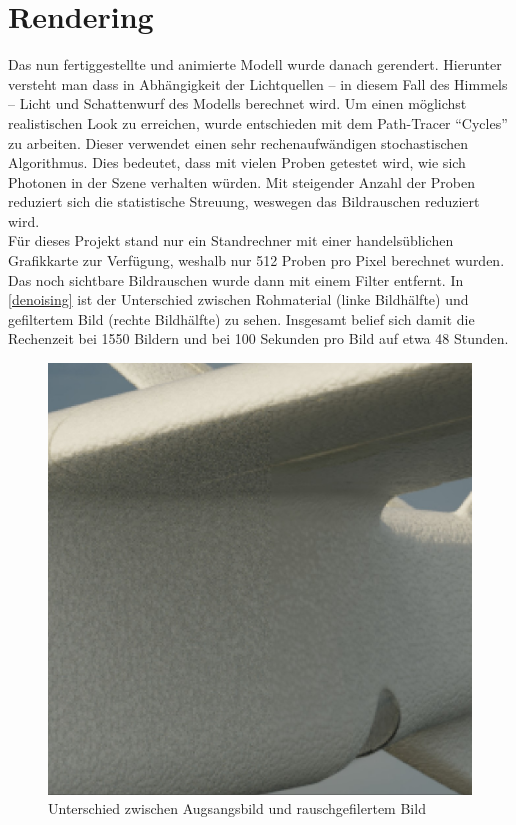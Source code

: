 \section{Rendering}
\label{sec:rendering}

Das nun fertiggestellte und animierte Modell wurde danach gerendert. Hierunter versteht man dass in Abhängigkeit der Lichtquellen -- in diesem Fall des Himmels -- Licht und Schattenwurf des Modells berechnet wird. Um einen möglichst realistischen Look zu erreichen, wurde entschieden mit dem Path-Tracer ``Cycles'' zu arbeiten. Dieser verwendet einen sehr rechenaufwändigen stochastischen Algorithmus. Dies bedeutet, dass mit vielen Proben getestet wird, wie sich Photonen in der Szene verhalten würden. Mit steigender Anzahl der Proben reduziert sich die statistische Streuung, weswegen das Bildrauschen reduziert wird. \\
Für dieses Projekt stand nur ein Standrechner mit einer handelsüblichen Grafikkarte zur Verfügung, weshalb nur 512 Proben pro Pixel berechnet wurden. Das noch sichtbare Bildrauschen wurde dann mit einem Filter entfernt. In \autoref{denoising} ist der Unterschied zwischen Rohmaterial (linke Bildhälfte) und gefiltertem Bild (rechte Bildhälfte) zu sehen. Insgesamt belief sich damit die Rechenzeit bei 1550 Bildern und bei 100 Sekunden pro Bild auf etwa 48 Stunden.

\begin{figure}[H]
\begin{center}
\includegraphics[width=\textwidth]{gfx/post/denoising.jpg}
\caption{Unterschied zwischen Augsangsbild und rauschgefilertem Bild}
\label{denoising}
\end{center}
\end{figure}

